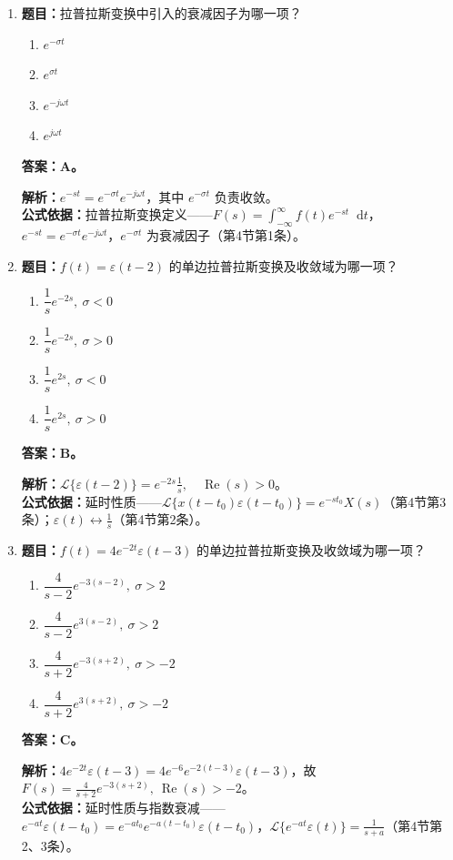 \documentclass[12pt,a4paper]{ctexart}
\newcommand{\eps}{\varepsilon}
\newcommand{\dif}{\mathop{}\!\mathrm{d}}
\begin{document}
\begin{enumerate}[label=\arabic*.]
\item \textbf{题目：}拉普拉斯变换中引入的衰减因子为哪一项？
\begin{enumerate}[label=\Alph*.]
\item $e^{-\sigma t}$
\item $e^{\sigma t}$
\item $e^{-j\omega t}$
\item $e^{j\omega t}$
\end{enumerate}
\textbf{答案：A。}\par
\textbf{解析：}$e^{-st}=e^{-\sigma t}e^{-j\omega t}$，其中 $e^{-\sigma t}$ 负责收敛。\\
\textbf{公式依据：}拉普拉斯变换定义——$F(s)=\int_{-\infty}^{\infty}f(t)e^{-st}\dif t$，$e^{-st}=e^{-\sigma t}e^{-j\omega t}$，$e^{-\sigma t}$ 为衰减因子（第4节第1条）。

\item \textbf{题目：}$f(t)=\eps(t-2)$ 的单边拉普拉斯变换及收敛域为哪一项？
\begin{enumerate}[label=\Alph*.]
\item $\dfrac1s e^{-2s},\ \sigma<0$
\item $\dfrac1s e^{-2s},\ \sigma>0$
\item $\dfrac1s e^{2s},\ \sigma<0$
\item $\dfrac1s e^{2s},\ \sigma>0$
\end{enumerate}
\textbf{答案：B。}\par
\textbf{解析：}\(\displaystyle \mathcal L\{\eps(t-2)\}=e^{-2s}\frac1s,\quad \operatorname{Re}(s)>0\)。\\
\textbf{公式依据：}延时性质——$\mathcal L\{x(t-t_0)\eps(t-t_0)\}=e^{-st_0}X(s)$（第4节第3条）；$\eps(t)\longleftrightarrow\frac1s$（第4节第2条）。

\item \textbf{题目：}$f(t)=4e^{-2t}\eps(t-3)$ 的单边拉普拉斯变换及收敛域为哪一项？
\begin{enumerate}[label=\Alph*.]
\item $\dfrac4{s-2}e^{-3(s-2)},\ \sigma>2$
\item $\dfrac4{s-2}e^{3(s-2)},\ \sigma>2$
\item $\dfrac4{s+2}e^{-3(s+2)},\ \sigma>-2$
\item $\dfrac4{s+2}e^{3(s+2)},\ \sigma>-2$
\end{enumerate}
\textbf{答案：C。}\par
\textbf{解析：}\(\displaystyle 4e^{-2t}\eps(t-3)=4e^{-6}e^{-2(t-3)}\eps(t-3)\)，故 \(\displaystyle F(s)=\frac4{s+2}e^{-3(s+2)},\ \operatorname{Re}(s)>-2\)。\\
\textbf{公式依据：}延时性质与指数衰减——$e^{-at}\eps(t-t_0)=e^{-at_0}e^{-a(t-t_0)}\eps(t-t_0)$，$\mathcal L\{e^{-at}\eps(t)\}=\frac1{s+a}$（第4节第2、3条）。


\end{enumerate}
\end{document}
